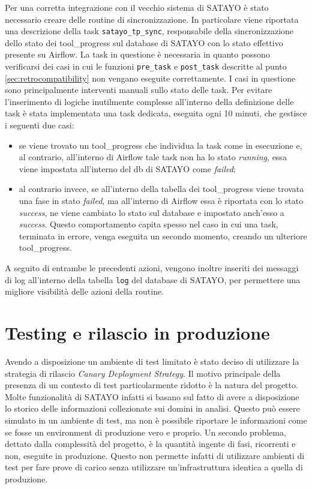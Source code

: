 Per una corretta integrazione con il vecchio sistema di SATAYO è stato necessario
creare delle routine di sincronizzazione. In particolare viene riportata una
descrizione della task \texttt{satayo\_tp\_sync}, responsabile della
sincronizzazione dello stato dei tool\_progress sul database di SATAYO con lo
stato effettivo presente su Airflow. La task in questione è necessaria in quanto
possono verificarsi dei casi in cui le funzioni \texttt{pre\_task} e \texttt{post\_task}
descritte al punto \ref{sec:retrocompatibility} non vengano eseguite correttamente.
I casi in questione sono principalmente interventi manuali sullo stato delle
task. Per evitare l'inserimento di logiche inutilmente complesse all'interno della
definizione delle task è stata implementata una task dedicata, eseguita ogni 10
minuti, che gestisce i seguenti due casi:

\begin{itemize}
  \item se viene trovato un tool\_progress che individua la task come in esecuzione
    e, al contrario, all'interno di Airflow tale task non ha lo stato \textit{running},
    essa viene impostata all'interno del db di SATAYO come \textit{failed};

  \item al contrario invece, se all'interno della tabella dei tool\_progress
    viene trovata una fase in stato \textit{failed}, ma all'interno di Airflow
    essa è riportata con lo stato \textit{success}, ne viene cambiato lo stato
    sul database e impostato anch'esso a \textit{success}. Questo comportamento
    capita spesso nel caso in cui una task, terminata in errore, venga eseguita
    un secondo momento, creando un ulteriore tool\_progress.
\end{itemize}

A seguito di entrambe le precedenti azioni, vengono inoltre inseriti dei messaggi
di log all'interno della tabella \texttt{log} del database di SATAYO, per permettere
una migliore visibilità delle azioni della routine.

\section{Testing e rilascio in produzione}
\label{sec:deployment}

Avendo a disposizione un ambiente di test limitato è stato deciso di utilizzare
la strategia di rilascio \textit{Canary Deployment Strategy}\cite{humble2010continuous}.
Il motivo principale della presenza di un contesto di test particolarmente ridotto
è la natura del progetto. Molte funzionalità di SATAYO infatti si basano sul
fatto di avere a disposizione lo storico delle informazioni collezionate sui
domini in analisi. Questo può essere simulato in un ambiente di test, ma non è
possibile riportare le informazioni come se fosse un environment di produzione
vero e proprio. Un secondo problema, dettato dalla complessità del progetto, è la
quantità ingente di fasi, ricorrenti e non, eseguite in produzione. Questo non
permette infatti di utilizzare ambienti di test per fare prove di carico senza
utilizzare un'infrastruttura identica a quella di produzione.

